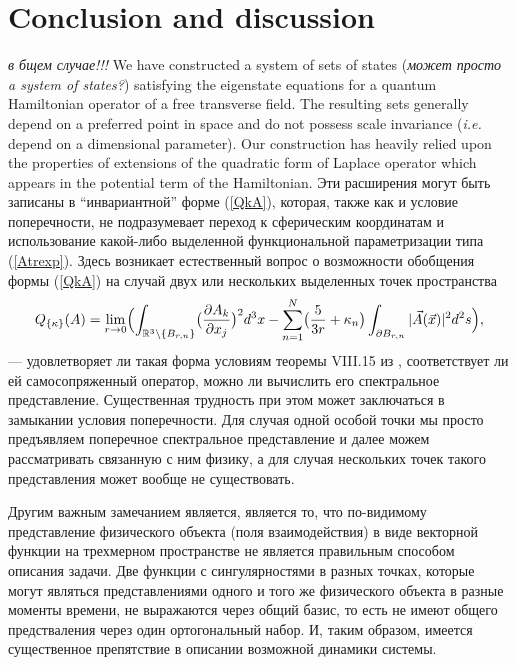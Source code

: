 \documentclass[12pt]{article}
\newcommand{\RR}{\mathbb{R}}
\begin{document}
\section{Conclusion and discussion}
{\it в бщем случае!!!}
	We have constructed a system of sets of states ({\it\small может просто a system of states?})
	satisfying the eigenstate equations for a quantum Hamiltonian operator
	of a free transverse field.
	The resulting sets generally depend on a preferred point in space and
	do not possess scale invariance ({\it i.e.} depend on a dimensional parameter).
	Our construction has heavily relied upon the properties of extensions
	of the quadratic form of Laplace operator which appears in the potential term
	of the Hamiltonian.
    Эти расширения могут быть записаны в ``инвариантной'' форме
(\ref{QkA}),
    которая, также как и условие поперечности, не подразумевает переход
    к сферическим координатам и использование какой-либо выделенной
    функциональной параметризации типа
(\ref{Atrexp}).
    Здесь возникает естественный вопрос о возможности обобщения формы
(\ref{QkA})
    на случай двух или нескольких выделенных точек пространства
\begin{equation*}
        Q_{\{\kappa\}}(A) = \lim_{r\to 0}\Bigl(
    \int_{\RR^{3}\setminus \{B_{r,n}\}}
        \bigl(\frac{\partial A_{k}}{\partial x_{j}}\bigr)^{2} d^{3} x -
    \sum_{n=1}^{N}\bigl(\frac{5}{3r}	+ \kappa_{n}\bigr)
	\int_{\partial B_{r,n}} |\vec{A}(\vec{x})|^{2} d^{2} s \Bigr) ,
\end{equation*}
    --- удовлетворяет ли такая форма условиям теоремы VIII.15 из
\cite{RS1},
    соответствует ли ей самосопряженный оператор, можно ли вычислить его
    спектральное представление. Существенная трудность при этом
    может заключаться в замыкании условия поперечности.
    Для случая одной особой точки мы просто предъявляем поперечное спектральное
    представление и далее можем рассматривать связанную с ним физику,
    а для случая нескольких точек такого представления может вообще
    не существовать.

    Другим важным замечанием является, является то, что по-видимому
    представление физического объекта (поля взаимодействия) в виде векторной
    функции на трехмерном пространстве не является правильным способом
    описания задачи. Две функции с сингулярностями в разных точках,
    которые могут являться представлениями одного и того же физического
    объекта в разные моменты времени, не выражаются через общий базис,
    то есть не имеют общего предстваления через один ортогональный набор.
    И, таким образом, имеется существенное препятствие в описании возможной
    динамики системы.
\end{document}
